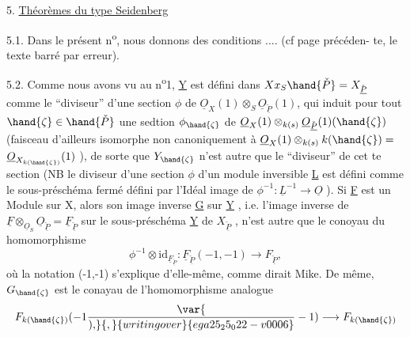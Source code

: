 
5. \uline{Th\'eor\`emes du type Seidenberg}

5.1.
Dans le pr\'esent n\textsuperscript{o}, nous donnons des conditions .... (cf page pr\'ec\'eden-%
te, le texte barr\'e par erreur).

5.2. Comme nous avons vu au n\textsuperscript{o}1, \underline{Y} est d\'efini dans $X x_S \hand{\check{P}} = X_{\check{\underline{P}}}$
comme le ``diviseur'' d'une section $\phi$ de $\underline{O}_X(1)\otimes_S \underline{O}_{\check{\underline{P}}}(1)$, qui induit pour
tout $\hand{\zeta} \in \hand{\check{P}}$ une sedtion $\phi_{\hand{\zeta}}$ de  $\underline{O}_X(1)\otimes_{k(s)}\underline{O}_{\check{\underline{P}}}(1)(\hand{\zeta})$
(faisceau d'ailleurs isomorphe non canoniquement \`a $\underline{O}_X(1)\otimes_{k(s)}k(\hand{\zeta}) =$
$\underline{O}_{X_{k(\hand{\zeta})}}(1)$ ), de sorte que $Y_{\hand{\zeta}}$ n'est autre que le  ``diviseur'' de cet
te section (NB le diviseur d'une section $\phi$ d'un module inversible \underline{L} 
est d\'efini comme le sous-pr\'esch\'ema ferm\'e d\'efini par l'Id\'eal image de
$\phi^{-1} : \underline{L}^{-1} \longrightarrow \underline{O}$ ). Si \underline{F} est un Module sur X, alors son image inverse \underline{G}
sur \underline{Y} , i.e. l'image inverse de $\underline{F}\otimes_{\underline{O}_S}\underline{O}_{\check{\underline{P}}} = \underline{F}_{\check{\underline{P}}}$ sur le sous-pr\'esch\'ema \underline{Y} de
$X_{\check{\underline{P}}}$ , n'est autre que le conoyau du homomorphisme
\[ \phi^{-1}\otimes \mathrm{id}_{\underline{F}_{\check{\underline{P}}}} : \underline{F}_{\check{\underline{P}}}(-1,-1) \longrightarrow F_{\check{\underline{P}}} , \]
o\`u la notation (-1,-1) s'explique d'elle-m\^eme, comme dirait Mike. De
m\^eme, $G_{\hand{\zeta}}$ est le conayau de l'homomorphisme analogue
\[ F_{k(\hand{\zeta})}(-1\var{\over{)}{,}}{,}{writing over}{ega25_25_022-v0006}-1) \longrightarrow F_{k(\hand{\zeta})} \]
